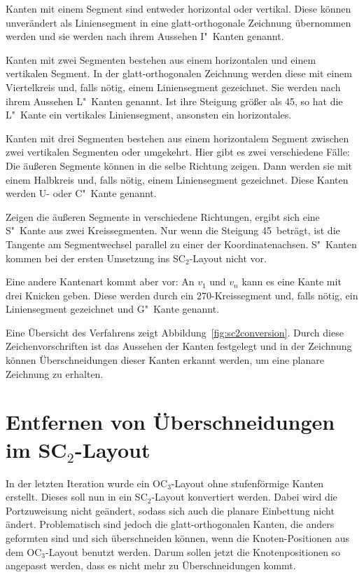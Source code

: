 \documentclass[a4paper]{scrreprt}
\theoremstyle{definition}
\begin{document}
Kanten mit einem Segment sind entweder horizontal oder vertikal. Diese können unverändert als Liniensegment in eine glatt-orthogonale Zeichnung übernommen werden und sie werden nach ihrem Aussehen I"~Kanten genannt.

Kanten mit zwei Segmenten bestehen aus einem horizontalen und einem vertikalen Segment. In der glatt-orthogonalen Zeichnung werden diese mit einem Viertelkreis und, falls nötig, einem Liniensegment gezeichnet. Sie werden nach ihrem Aussehen L"~Kanten genannt. Ist ihre Steigung größer als 45\textdegree, so hat die L"~Kante ein vertikales Liniensegment, ansonsten ein horizontales.

Kanten mit drei Segmenten bestehen aus einem horizontalem Segment zwischen zwei vertikalen Segmenten oder umgekehrt. Hier gibt es zwei verschiedene Fälle: Die äußeren Segmente können in die selbe Richtung zeigen. Dann werden sie mit einem Halbkreis und, falls nötig, einem Liniensegment gezeichnet. Diese Kanten werden U- oder C"~Kante genannt.

Zeigen die äußeren Segmente in verschiedene Richtungen, ergibt sich eine S"~Kante aus zwei Kreissegmenten. Nur wenn die Steigung 45\textdegree\ beträgt, ist die Tangente am Segmentwechsel parallel zu einer der Koordinatenachsen. S"~Kanten kommen bei der ersten Umsetzung ins SC$_2$-Layout nicht vor.

Eine andere Kantenart kommt aber vor: An $v_1$ und $v_n$ kann es eine Kante mit drei Knicken geben. Diese werden durch ein 270\textdegree-Kreissegment und, falls nötig, ein Liniensegment gezeichnet und G"~Kante genannt.

Eine Übersicht des Verfahrens zeigt Abbildung~\ref{fig:sc2conversion}. Durch diese Zeichenvorschriften ist das Aussehen der Kanten festgelegt und in der Zeichnung können Überschneidungen dieser Kanten erkannt werden, um eine planare Zeichnung zu erhalten.

\section{Entfernen von Überschneidungen im SC$_2$-Layout}

In der letzten Iteration wurde ein OC$_3$-Layout ohne stufenförmige Kanten erstellt. Dieses soll nun in ein SC$_2$-Layout konvertiert werden. Dabei wird die Portzuweisung nicht geändert, sodass sich auch die planare Einbettung nicht ändert. Problematisch sind jedoch die glatt-orthogonalen Kanten, die anders geformten sind und sich überschneiden können, wenn die Knoten-Positionen aus dem OC$_3$-Layout benutzt werden. Darum sollen jetzt die Knotenpositionen so angepasst werden, dass es nicht mehr zu Überschneidungen kommt.
\end{document}
